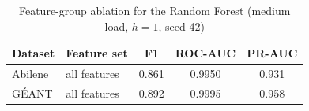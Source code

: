 \begin{table}[t]
\centering
\caption{Feature-group ablation for the Random Forest (medium load, $h=1$, seed 42)}
\label{tab:abl_feat}
\scriptsize\setlength{\tabcolsep}{2.5pt}
\begin{tabular}{@{}llccc@{}}
\toprule
Dataset & Feature set & F1 & ROC-AUC & PR-AUC \\
\midrule
Abilene & all features & 0.861 & 0.9950 & 0.931 \\
G\'EANT & all features & 0.892 & 0.9995 & 0.958 \\
\bottomrule
\end{tabular}
\end{table}
